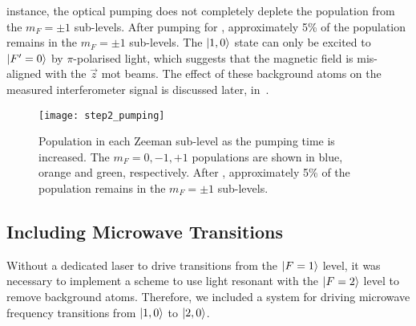 instance, the optical pumping does not completely deplete the
population from the \(m_F = \pm 1\) sub-levels. After pumping for
, approximately 5\% of the population
remains in the \(m_F = \pm 1\) sub-levels. The \(\ket{1,0}\) state can
only be excited to \(\ket{F'=0}\) by \(\pi\)-polarised light, which
suggests that the magnetic field is mis-aligned with the \(\vec{z}\)
\ac{mot} beams. The effect of these background atoms on the measured
interferometer signal is discussed later,
in~.
\begin{figure}[!htbp]
    \centering
    \texttt{[image: step2\_pumping]}
    \caption[\(\ket{1,m_F}\) populations for increasing  pumping time.]{Population in each Zeeman sub-level as the  pumping time is increased. The \(m_F = 0, -1, +1\) populations are shown in blue, orange and green, respectively. After , approximately 5\% of the population remains in the \(m_F = \pm 1\) sub-levels.}
    \label{fig:step2_pumping}
\end{figure}
\subsection{Including Microwave Transitions}\label{subsec:microwaves}
Without a dedicated laser to drive transitions from the \(\ket{F=1}\)
level, it was necessary to implement a scheme to use light resonant
with the \(\ket{F=2}\) level to remove background atoms. Therefore, we
included a system for driving microwave frequency transitions from
\(\ket{1,0}\) to \(\ket{2,0}\).
